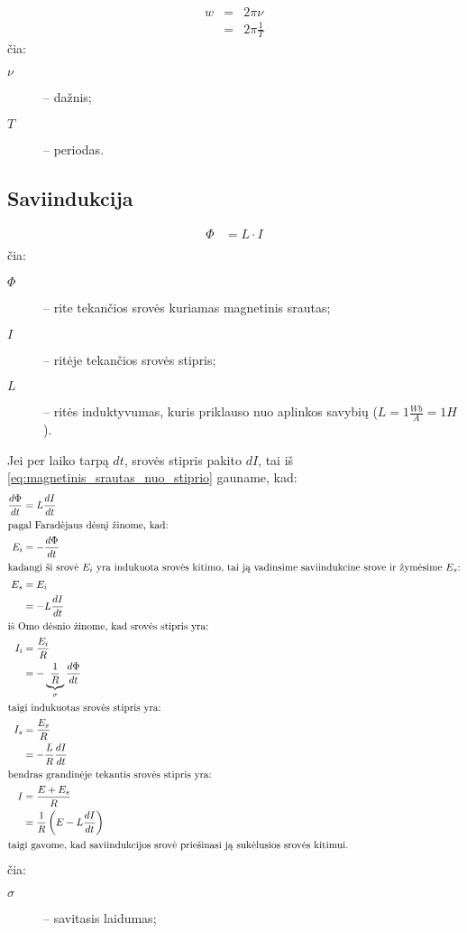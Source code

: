 \begin{defn}
  \begin{align*}
    w
    &=& 2 \pi \nu \\
    &=& 2 \pi \frac{1}{T} 
  \end{align*}
  čia:
  \begin{description}
    \item[$\nu$] – dažnis;
    \item[$T$] – periodas.
  \end{description}
\end{defn}

\subsection{Saviindukcija}

\begin{align}
  \Phi &= L \cdot I \label{eq:magnetinis_srautas_nuo_stiprio} \\
\end{align}
čia:
\begin{description}
  \item[$\Phi$] – rite tekančios srovės kuriamas magnetinis srautas;
  \item[$I$] – ritėje tekančios srovės stipris;
  \item[$L$] – ritės induktyvumas, kuris priklauso nuo aplinkos savybių
    ($L = 1 \frac{Wb}{A} = 1H$).
\end{description}

Jei per laiko tarpą $dt$, srovės stipris pakito $dI$, tai
iš \ref{eq:magnetinis_srautas_nuo_stiprio} gauname, kad:
\begin{align*}
  \frac{d\Phi}{dt}
    &= L \frac{dI}{dt} \\
  \intertext{pagal Faradėjaus dėsnį žinome, kad:}
  E_{i}
    &= - \frac{d\Phi}{dt} \\
  \intertext{kadangi ši srovė $E_{i}$ yra indukuota srovės kitimo,
  tai ją vadinsime saviindukcine srove ir žymėsime $E_{s}$:}
  E_{s}
    &= E_{i} \\
    &= - L \frac{dI}{dt} \\
  \intertext{iš Omo dėsnio žinome, kad srovės stipris yra:}
  I_{i}
    &= \frac{E_{i}}{R} \\
    &= - \underbrace{\frac{1}{R}}_{\sigma} \frac{d\Phi}{dt} \\
  \intertext{taigi indukuotas srovės stipris yra:}
  I_{s}
    &=  \frac{E_{s}}{R} \\
    &= - \frac{L}{R} \frac{dI}{dt} \\
  \intertext{bendras grandinėje tekantis srovės stipris yra:}
  I
    &= \frac{E + E_{s}}{R} \\
    &= \frac{1}{R} \left( E - L \frac{dI}{dt} \right) \\
  \intertext{taigi gavome, kad saviindukcijos srovė priešinasi ją
  sukėlusios srovės kitimui.}
\end{align*}
čia:
\begin{description}
  \item[$\sigma$] – savitasis laidumas;
\end{description}

